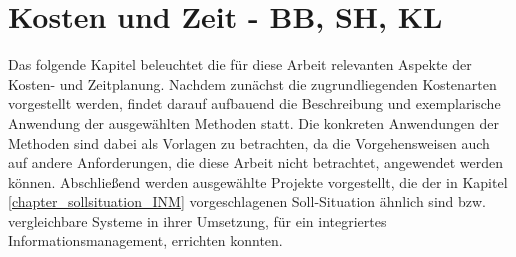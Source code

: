 
\chapter{Kosten und Zeit - BB, SH, KL}

Das folgende Kapitel beleuchtet die für diese Arbeit relevanten Aspekte der Kosten- und Zeitplanung. Nachdem zunächst die zugrundliegenden Kostenarten vorgestellt werden, findet darauf aufbauend die Beschreibung und exemplarische Anwendung der ausgewählten Methoden statt. Die konkreten Anwendungen der Methoden sind dabei als Vorlagen zu betrachten, da die Vorgehensweisen auch auf andere Anforderungen, die diese Arbeit nicht betrachtet, angewendet werden k\"onnen. Abschließend werden ausgew\"ahlte Projekte vorgestellt, die der in Kapitel \ref{chapter_sollsituation_INM} vorgeschlagenen Soll-Situation \"ahnlich sind bzw. vergleichbare Systeme in ihrer Umsetzung, f\"ur ein integriertes Informationsmanagement, errichten konnten.





\clearpage

